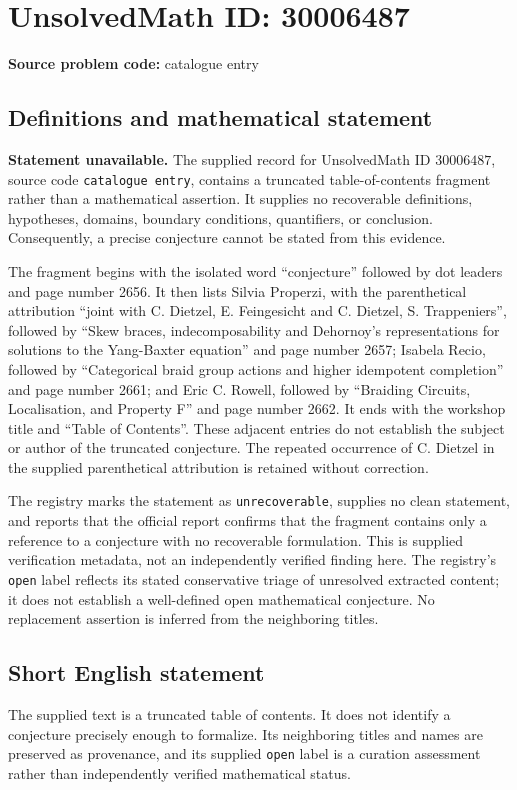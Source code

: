 \documentclass[11pt]{article}
\begin{document}
\section*{UnsolvedMath ID: 30006487}
\textbf{Source problem code:} catalogue entry
\subsection{Definitions and mathematical statement}
\textbf{Statement unavailable.} The supplied record for UnsolvedMath ID \(30006487\), source code \texttt{catalogue entry}, contains a truncated table-of-contents fragment rather than a mathematical assertion. It supplies no recoverable definitions, hypotheses, domains, boundary conditions, quantifiers, or conclusion. Consequently, a precise conjecture cannot be stated from this evidence.

The fragment begins with the isolated word ``conjecture'' followed by dot leaders and page number 2656. It then lists Silvia Properzi, with the parenthetical attribution ``joint with C. Dietzel, E. Feingesicht and C. Dietzel, S. Trappeniers'', followed by ``Skew braces, indecomposability and Dehornoy's representations for solutions to the Yang-Baxter equation'' and page number 2657; Isabela Recio, followed by ``Categorical braid group actions and higher idempotent completion'' and page number 2661; and Eric C. Rowell, followed by ``Braiding Circuits, Localisation, and Property F'' and page number 2662. It ends with the workshop title and ``Table of Contents''. These adjacent entries do not establish the subject or author of the truncated conjecture. The repeated occurrence of C. Dietzel in the supplied parenthetical attribution is retained without correction.

The registry marks the statement as \texttt{unrecoverable}, supplies no clean statement, and reports that the official report confirms that the fragment contains only a reference to a conjecture with no recoverable formulation. This is supplied verification metadata, not an independently verified finding here. The registry's \texttt{open} label reflects its stated conservative triage of unresolved extracted content; it does not establish a well-defined open mathematical conjecture. No replacement assertion is inferred from the neighboring titles.
\subsection{Short English statement}
The supplied text is a truncated table of contents. It does not identify a conjecture precisely enough to formalize. Its neighboring titles and names are preserved as provenance, and its supplied \texttt{open} label is a curation assessment rather than independently verified mathematical status.
\end{document}
